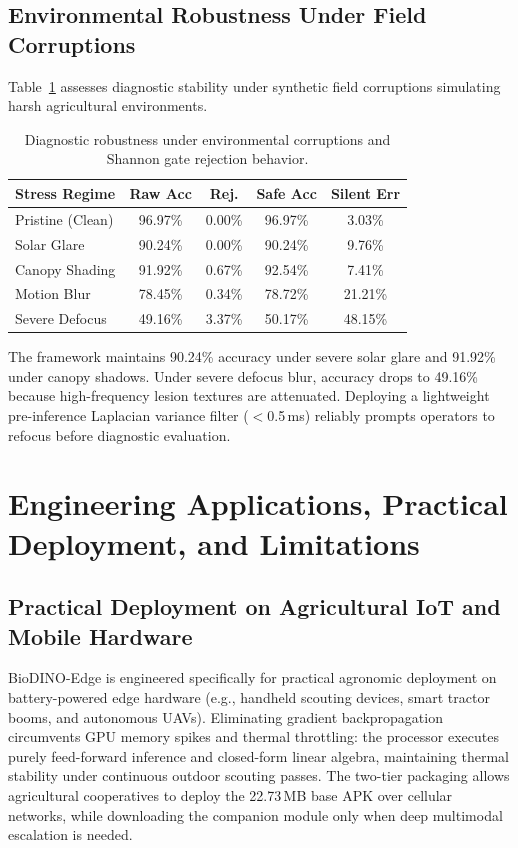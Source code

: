 \documentclass[a4paper,fleqn,nologo]{cas-dc}
\begin{document}
\subsection{Environmental Robustness Under Field Corruptions}
\label{sec:stress}
Table~\ref{tab:stress_bench} assesses diagnostic stability under synthetic field corruptions simulating harsh agricultural environments.

\begin{table}[htbp]
\centering
\caption{Diagnostic robustness under environmental corruptions and Shannon gate rejection behavior.}
\label{tab:stress_bench}
\footnotesize
\setlength{\tabcolsep}{2pt}
\begin{tabular*}{\columnwidth}{@{\extracolsep{\fill}}lcccc}
\toprule
\textbf{Stress Regime} & \textbf{Raw Acc} & \textbf{Rej.} & \textbf{Safe Acc} & \textbf{Silent Err} \\
\midrule
Pristine (Clean) & 96.97\% & 0.00\% & 96.97\% & 3.03\% \\
Solar Glare & 90.24\% & 0.00\% & 90.24\% & 9.76\% \\
Canopy Shading & 91.92\% & 0.67\% & 92.54\% & 7.41\% \\
Motion Blur & 78.45\% & 0.34\% & 78.72\% & 21.21\% \\
Severe Defocus & 49.16\% & 3.37\% & 50.17\% & 48.15\% \\
\bottomrule
\end{tabular*}
\end{table}

The framework maintains 90.24\% accuracy under severe solar glare and 91.92\% under canopy shadows. Under severe defocus blur, accuracy drops to 49.16\% because high-frequency lesion textures are attenuated. Deploying a lightweight pre-inference Laplacian variance filter ($<$0.5\,ms) reliably prompts operators to refocus before diagnostic evaluation.

\section{Engineering Applications, Practical Deployment, and Limitations}
\label{sec:discussion}

\subsection{Practical Deployment on Agricultural IoT and Mobile Hardware}
BioDINO-Edge is engineered specifically for practical agronomic deployment on battery-powered edge hardware (e.g., handheld scouting devices, smart tractor booms, and autonomous UAVs). Eliminating gradient backpropagation circumvents GPU memory spikes and thermal throttling: the processor executes purely feed-forward inference and closed-form linear algebra, maintaining thermal stability under continuous outdoor scouting passes. The two-tier packaging allows agricultural cooperatives to deploy the 22.73\,MB base APK over cellular networks, while downloading the companion module only when deep multimodal escalation is needed.
\end{document}
